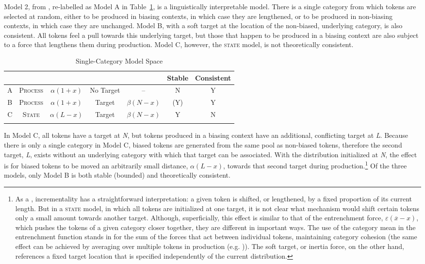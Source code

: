 Model 2, from , re-labelled
as Model A in Table~\ref{tab: Model Comparison-1}, is a linguistically
interpretable model. There is a single category from which tokens
are selected at random, either to be produced in biasing contexts,
in which case they are lengthened, or to be produced in non-biasing
contexts, in which case they are unchanged. Model B, with a soft target
at the location of the non-biased, underlying category, is also consistent.
All tokens feel a pull towards this underlying target, but those that
happen to be produced in a biasing context are also subject to a force
that lengthens them during production. Model C, however, the \textsc{state}
model, is not theoretically consistent. 

\begin{table}[h]\footnotesize
\caption{Single-Category Model Space\label{tab: Model Comparison-1}}
\begin{tabular}{ccccccc}
\lsptoprule
 & \multicolumn{2}{c}{} & \multicolumn{2}{c}{} & Stable & Consistent\tabularnewline
\midrule
A & \textsc{Process} & $\alpha(1+x)$ & No Target & – & N & Y\tabularnewline
B & \textsc{Process} & $\alpha(1+x)$ & Target & $\beta(N-x)$ & (Y) & Y\tabularnewline
C & \textsc{State} & $\alpha(L-x)$ & Target & $\beta(N-x)$ & Y & N\tabularnewline
\lspbottomrule
\end{tabular}
\end{table}

In Model C, all tokens have a target at \emph{N}, but tokens produced
in a biasing context have an additional, conflicting target at \emph{L}.
Because there is only a single category in Model C, biased tokens
are generated from the same pool as non-biased tokens, therefore the
second target, \emph{L}, exists without an underlying category with
which that target can be associated. With the distribution initialized
at \emph{N}, the effect is for biased tokens to be moved an arbitrarily
small distance, $\alpha(L-x)$, towards that second target during
production.\footnote{As a , incrementality has a straightforward interpretation:
a given token is shifted, or lengthened, by a fixed proportion of
its current length. But in a \textsc{state} model, in which all tokens
are initialized at one target, it is not clear what mechanism would
shift certain tokens only a small amount towards another target. Although,
superficially, this effect is similar to that of the entrenchment
force, $\varepsilon(\overline{x}-x)$, which pushes the tokens of
a given category closer together, they are different in important
ways. The use of the category mean in the entrenchment function stands
in for the sum of the forces that act between individual tokens, maintaining
category cohesion (the same effect can be achieved by averaging over
multiple tokens in production (e.g. \citealt{Pierrehumbert2000,Wedela})).
The soft target, or inertia force, on the other hand, references a
fixed target location that is specified independently of the current
distribution. } Of the three models, only Model B is both stable (bounded) and
theoretically consistent. 


